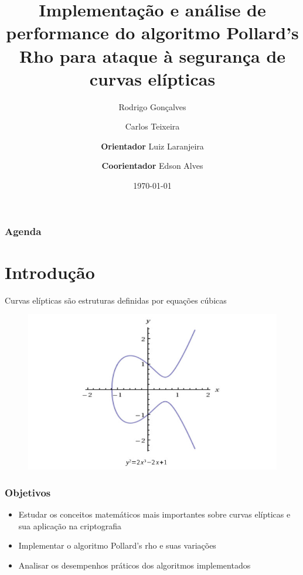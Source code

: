 \documentclass{beamer}
\title[TCC]{Implementação e análise de performance do algoritmo Pollard's Rho para ataque à segurança de curvas elípticas} %
\author[Rodrigo Gonçalves \and Carlos Teixeira]{Rodrigo Gonçalves \and Carlos Teixeira\\ \and \textbf{Orientador} Luiz Laranjeira\\ \and \textbf{Coorientador} Edson Alves}
\institute[UnB-FGA] %
{
Universidade de Brasília - Campus Gama - FGA\\ %
\medskip
}
\date{\today} %
\begin{document}
\begin{frame}
\titlepage %
\end{frame}

\begin{frame}
\frametitle{Agenda} %
\tableofcontents %


\end{frame}

\section{Introdução}
\begin{frame}

Curvas elípticas são estruturas definidas por equações cúbicas

\begin{figure}
\includegraphics[scale = 0.3]{curva_eliptica}
\end{figure}

\end{frame}

\begin{frame}
\frametitle{Objetivos}
\begin{itemize}
\item Estudar os conceitos matemáticos mais importantes sobre curvas elípticas e sua aplicação na criptografia
\item Implementar o algoritmo Pollard's rho e suas variações
\item Analisar os desempenhos práticos dos algoritmos implementados
\end{itemize}
\end{frame}
\end{document}
